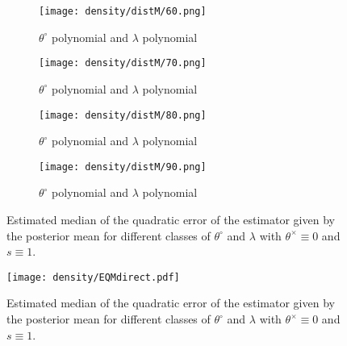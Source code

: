 \begin{figure}\ContinuedFloat
\begin{subfigure}{.45\textwidth}
  \centering
  \texttt{[image: density/distM/60.png]}
  \caption{$\theta^{\circ}$ polynomial and $\lambda$ polynomial}
  \label{fig3:sub1}
\end{subfigure}%
\begin{subfigure}{.45\textwidth}
  \centering
  \texttt{[image: density/distM/70.png]}
  \caption{$\theta^{\circ}$ polynomial and $\lambda$ polynomial}
  \label{fig3:sub1}
\end{subfigure}%

\begin{subfigure}{.45\textwidth}
  \centering
  \texttt{[image: density/distM/80.png]}
  \caption{$\theta^{\circ}$ polynomial and $\lambda$ polynomial}
  \label{fig3:sub1}
\end{subfigure}%
\begin{subfigure}{.45\textwidth}
  \centering
  \texttt{[image: density/distM/90.png]}
  \caption{$\theta^{\circ}$ polynomial and $\lambda$ polynomial}
  \label{fig3:sub1}
\end{subfigure}%

\caption{Estimated median of the quadratic error of the estimator given by the posterior mean for different classes of $\theta^{\circ}$ and $\lambda$ with $\theta^{\times} \equiv 0$ and $s \equiv 1$.}
\label{EQM}
\end{figure}




\begin{figure}
\centering
  \centering
  \texttt{[image: density/EQMdirect.pdf]}
\caption{Estimated median of the quadratic error of the estimator given by the posterior mean for different classes of $\theta^{\circ}$ and $\lambda$ with $\theta^{\times} \equiv 0$ and $s \equiv 1$.}
\label{EQM}
\end{figure}



